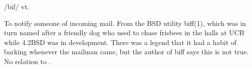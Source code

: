  /bif/ vt.

To notify someone of incoming mail. From the BSD utility biff(1), which
was in turn named after a friendly dog who used to chase frisbees in the
halls at UCB while 4.2BSD was in development. There was a legend that it
had a habit of barking whenever the mailman came, but the author of biff
says this is not true. No relation to .

